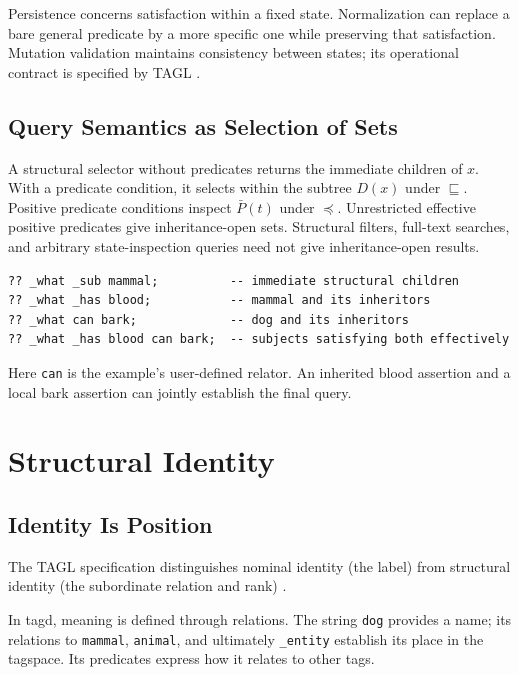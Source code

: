 \documentclass{article}
\begin{document}
Persistence concerns satisfaction within a fixed state. Normalization can
replace a bare general predicate by a more specific one while preserving
that satisfaction. Mutation validation maintains consistency between states;
its operational contract is specified by TAGL \cite{spec}.

\subsection{Query Semantics as Selection of Sets}

A structural selector without predicates returns the immediate children of $x$.
With a predicate condition, it selects within the subtree $D(x)$ under
$\sqsubseteq$. Positive predicate conditions inspect $\bar P(t)$ under $\preceq$. Unrestricted effective positive
predicates give inheritance-open sets. Structural filters, full-text searches,
and arbitrary state-inspection queries need not give inheritance-open results.

\begin{lstlisting}[style=tagl, caption={Structure and effective predicate selection}]
?? _what _sub mammal;          -- immediate structural children
?? _what _has blood;           -- mammal and its inheritors
?? _what can bark;             -- dog and its inheritors
?? _what _has blood can bark;  -- subjects satisfying both effectively
\end{lstlisting}
Here \texttt{can} is the example's user-defined relator. An inherited blood
assertion and a local bark assertion can jointly establish the final query.

\section{Structural Identity}

\subsection{Identity Is Position}

The TAGL specification distinguishes nominal identity (the label) from
structural identity (the subordinate relation and rank) \cite{spec}.

In tagd, meaning is defined through relations. The string \texttt{dog}
provides a name; its relations to \texttt{mammal}, \texttt{animal}, and
ultimately \texttt{\_entity} establish its place in the tagspace. Its
predicates express how it relates to other tags.
\end{document}
